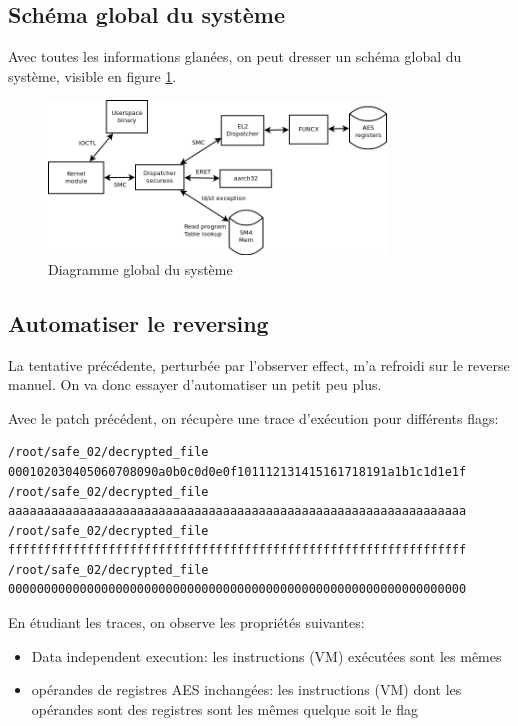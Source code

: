 \documentclass[14pt]{article}
\theoremstyle{definition}
\begin{document}
\subsection{\:Schéma global du système}


Avec toutes les informations glanées, on peut dresser un schéma global du système, visible en figure \ref{fig:p3_diag}.
\begin{figure}[H]
\centering
\includegraphics[width=0.8\textwidth]{./screenshots/diag.png}
  \caption{Diagramme global du système}
  \label{fig:p3_diag}
\end{figure}


\subsection{\:Automatiser le reversing}

La tentative précédente, perturbée par l'observer effect, m'a refroidi sur le reverse manuel. On va donc essayer d'automatiser un petit peu plus.


Avec le patch précédent, on récupère une trace d'exécution pour différents flags:
\begin{verbatim}
/root/safe_02/decrypted_file 000102030405060708090a0b0c0d0e0f101112131415161718191a1b1c1d1e1f
/root/safe_02/decrypted_file aaaaaaaaaaaaaaaaaaaaaaaaaaaaaaaaaaaaaaaaaaaaaaaaaaaaaaaaaaaaaaaa
/root/safe_02/decrypted_file ffffffffffffffffffffffffffffffffffffffffffffffffffffffffffffffff
/root/safe_02/decrypted_file 0000000000000000000000000000000000000000000000000000000000000000
\end{verbatim}


En étudiant les traces, on observe les propriétés suivantes:
\begin{itemize}
  \item Data independent execution: les instructions (VM) exécutées sont les mêmes
  \item opérandes de registres AES inchangées: les instructions (VM) dont les opérandes sont des registres sont les mêmes quelque soit le flag
\end{itemize}
\end{document}
